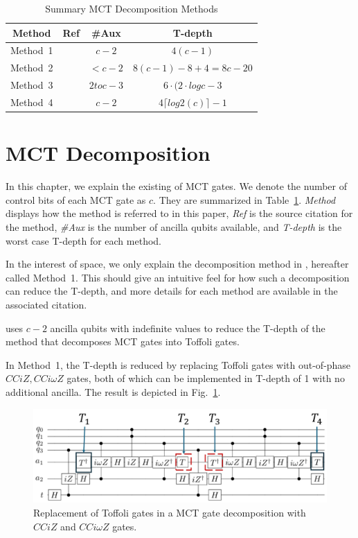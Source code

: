 \begin{table}
  \begin{tabular}{c|c|c|c}
    \hline
    Method   & Ref                             & \#Aux  & T-depth \\\hline
    Method~1 & \cite{abdessaied2016technology} & $c-2$ & $4(c-1)$\\\hline 
    Method~2 & \cite{abdessaied2016technology} & $<c-2$ & $8(c-1)-8+4=8c-20$ \\\hline
    Method~3 & \cite{baker2019decomposing}     & $2 to c-3$ & $6\cdot (2 \cdot log c-3$\\\hline
    Method~4 & \cite{niemann2019t}             & $c-2$ & $4\lceil log2(c) \rceil - 1$\\\hline            
  \end{tabular}
  \caption{Summary MCT Decomposition Methods}
  \label{decomp-table}
\end{table}

\section{MCT Decomposition}
In this chapter, we explain the existing  of MCT gates. We denote the number of control bits of each MCT gate as $c$. They are summarized in Table~\ref{decomp-table}. {\it Method} displays how the method is referred to in this paper, {\it Ref} is the source citation for the method, {\it \#Aux} is the number of ancilla qubits available, and {\it T-depth} is the worst case T-depth for each method. 

In the interest of space, we only explain the decomposition method in \cite{abdessaied2016technology}, hereafter called Method~1. This should give an intuitive feel for how such a decomposition can reduce the T-depth, and more details for each method are available in the associated citation.

 uses $c-2$ ancilla qubits with indefinite values to reduce the T-depth of the method \cite{barenco1995elementary} that decomposes MCT gates into Toffoli gates.

In Method~1, the T-depth is reduced by replacing Toffoli gates with out-of-phase $CCiZ, CCi\omega Z$ gates, both of which can be implemented in T-depth of 1 with no additional ancilla. The result is depicted in Fig.~\ref{barenco_iz_to_iomegaz}.

\begin{figure}[tbp]
\centering
\includegraphics[width=0.95\linewidth]{img/barenco_iz_to_iomegaz.pdf}
\caption{Replacement of Toffoli gates in a MCT gate decomposition with $CCiZ$ and $CCi\omega Z$ gates.}

\label{barenco_iz_to_iomegaz}

\end{figure}
